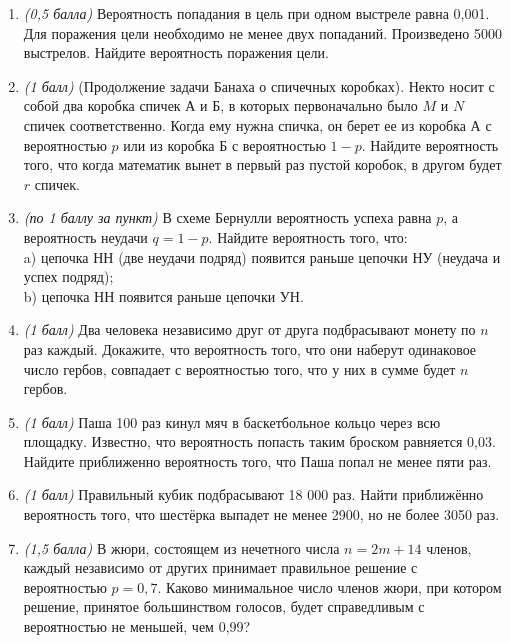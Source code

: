 \documentclass{article}
\begin{document}
\begin{enumerate}

    \item \textit{(0,5 балла)} Вероятность попадания в цель при одном выстреле равна 0,001. Для поражения цели необходимо не менее двух попаданий. Произведено 5000 выстрелов. Найдите вероятность поражения цели.
    
    \item \textit{(1 балл)} (Продолжение задачи Банаха о спичечных коробках). Некто носит с собой два коробка спичек А и Б, в которых первоначально было $M$ и $N$ спичек соответственно. Когда ему нужна спичка, он берет ее из коробка А с вероятностью $p$ или из коробка Б с вероятностью $1-p$. Найдите вероятность того, что когда математик вынет в первый раз пустой коробок, в другом будет $r$ спичек.
    
    \item \textit{(по 1 баллу за пункт)}  В схеме Бернулли вероятность успеха равна $p$, а вероятность неудачи $q = 1-p$. Найдите вероятность того, что:\\
    a) цепочка НН (две неудачи подряд) появится раньше цепочки НУ (неудача и успех подряд);\\
    b) цепочка НН появится раньше цепочки УН.
    
    \item \textit{(1 балл)} Два человека независимо друг от друга подбрасывают монету по $n$ раз каждый. Докажите, что вероятность того, что они наберут одинаковое число гербов, совпадает с вероятностью того, что у них в сумме будет $n$ гербов.
    
    \item \textit{(1 балл)} Паша 100 раз кинул мяч в баскетбольное кольцо через всю площадку. Известно, что вероятность попасть таким броском равняется 0,03. Найдите приближенно вероятность того, что Паша попал не менее пяти раз.
    
    \item \textit{(1 балл)} Правильный кубик подбрасывают 18 000 раз. Найти приближённо вероятность того, что шестёрка выпадет не менее 2900, но не более 3050 раз.
    
    \item \textit{(1,5 балла)} В жюри, состоящем из нечетного числа $n = 2m + 14$ членов, каждый независимо от других принимает правильное решение с вероятностью $p = 0,7$. Каково минимальное число членов жюри, при котором решение, принятое большинством голосов, будет справедливым с вероятностью не меньшей, чем 0,99?
    
\end{enumerate}

  
\end{document}
